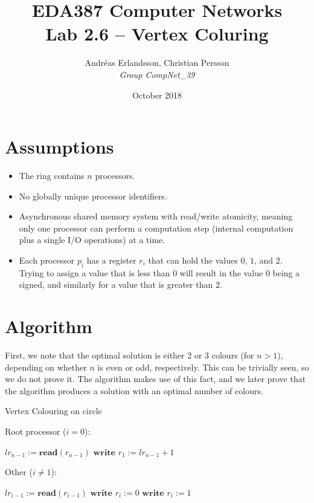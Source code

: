 \documentclass{article}
\title{EDA387 Computer Networks\\Lab 2.6 -- Vertex Coluring}
\author{Andréas Erlandsson, Christian Persson\\\it{Group CompNet\_39} }
\date{October 2018}
\begin{document}
\maketitle

\section*{Assumptions}
\begin{itemize}
    \item The ring contains $n$ processors.
    \item No globally unique processor identifiers.
    \item Asynchronous shared memory system with read/write atomicity, meaning only one processor can perform a computation step (internal computation plus a single I/O operations) at a time.
    \item Each processor $p_i$ has a register $r_i$ that can hold the values $0$, $1$, and $2$. Trying to assign a value that is less than $0$ will result in the value $0$ being a signed, and similarly for a value that is greater than $2$. 
\end{itemize}

\section*{Algorithm}
First, we note that the optimal solution is either 2 or 3 colours (for $n > 1$), depending on whether $n$ is even or odd, respectively. This can be trivially seen, so we do not prove it. The algorithm makes use of this fact, and we later prove that the algorithm produces a solution with an optimal number of colours.

\begin{algorithm}
    \caption{Vertex Colouring on circle}
    Root processor ($i = 0$):
    \begin{algorithmic}[1]
            \State $lr_{n - 1} := \textbf{read}(r_{n - 1})$
            \State $\textbf{write } r_1 := lr_{n - 1} + 1$
        \EndWhile
    \end{algorithmic}
    Other ($i \neq 1$):
    \begin{algorithmic}[1]
            \State $lr_{i - 1} := \textbf{read}(r_{i - 1})$
                \State $\textbf{write } r_i := 0$
            \Else
                \State $\textbf{write } r_i := 1$
            \EndIf
        \EndWhile
    \end{algorithmic}
\end{algorithm}
\end{document}
